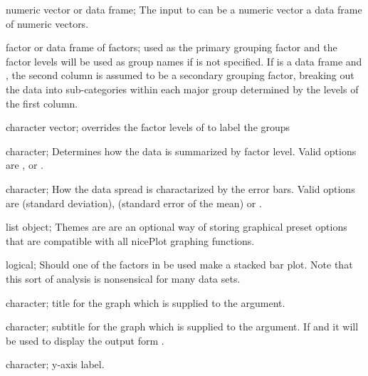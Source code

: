\documentclass[a4paper]{book}
\begin{document}
\begin{Arguments}
\begin{ldescription}
\item[\code{x}] numeric vector or data frame; The input to  can be a numeric vector a  data frame of numeric vectors.

\item[\code{by}] factor or data frame of factors; used as the primary grouping factor and the factor levels will be used as group names if  is not specified. If  is a data frame and , the second column is assumed to be a secondary grouping factor, breaking out the data into sub-categories within each major group determined by the levels of the first column.

\item[\code{groupNames}] character vector; overrides the factor levels of  to label the groups

\item[\code{aggFun}] character; Determines how the data is summarized by factor level. Valid options are ,  or .

\item[\code{errFun}] character; How the data spread is charactarized by the error bars. Valid options are  (standard deviation),  (standard error of the mean) or .

\item[\code{theme}] list object; Themes are are an optional way of storing graphical preset options that are compatible with all nicePlot graphing functions.

\item[\code{stack}] logical; Should one of the factors in  be used make a stacked bar plot. Note that this sort of analysis is nonsensical for many data sets.

\item[\code{main}] character; title for the graph which is supplied to the  argument.

\item[\code{sub}] character; subtitle for the graph which is supplied to the  argument. If  and  it will be used to display the output form .

\item[\code{ylab}] character; y-axis label.


\end{ldescription}
\end{Arguments}
\end{document}
